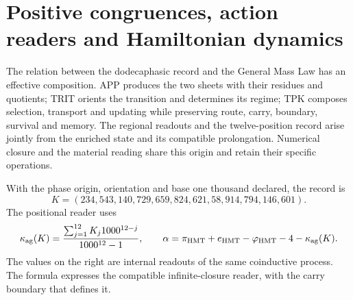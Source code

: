 
\section{Positive congruences, action readers and Hamiltonian dynamics}
\label{sec:k-mass-bridge}

The relation between the dodecaphasic record and the General Mass Law has
an effective composition. APP produces the two sheets with their residues and
quotients; TRIT orients the transition and determines its regime; TPK composes
selection, transport and updating while preserving route, carry, boundary,
survival and memory. The regional readouts and the twelve-position record
arise jointly from the enriched state and its compatible
prolongation. Numerical closure and the material reading
share this origin and retain their specific operations.

With the phase origin, orientation and base one thousand declared, the record is
\[
 K=(234,543,140,729,659,824,621,58,914,794,146,601).
\]
The positional reader uses
\begin{equation}
 \kappa_{\rm ag}(K)=\frac{\sum_{j=1}^{12}K_j1000^{12-j}}{1000^{12}-1},
 \qquad
 \alpha=\pi_{\rm HMT}+e_{\rm HMT}-\varphi_{\rm HMT}-4-
              \kappa_{\rm ag}(K).
 \label{eq:mass-k-alpha}
\end{equation}
The values on the right are internal readouts of the same coinductive
process. The formula expresses the compatible infinite-closure reader,
with the carry boundary that defines it.

